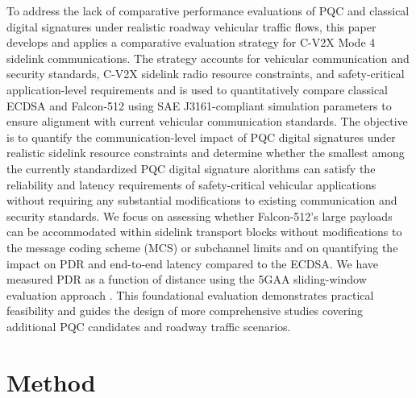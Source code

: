 \documentclass[conference]{IEEEtran}
\begin{document}
To address the lack of comparative performance evaluations of PQC and classical digital signatures under realistic roadway vehicular traffic flows, this paper develops and applies a comparative evaluation strategy for C-V2X Mode 4 sidelink communications. The strategy accounts for vehicular communication and security standards, C-V2X sidelink radio resource constraints, and safety-critical application-level requirements and is used to quantitatively compare classical ECDSA and Falcon-512 using SAE J3161-compliant simulation parameters to ensure alignment with current vehicular communication standards. The objective is to quantify the communication-level impact of PQC digital signatures under realistic sidelink resource constraints and determine whether the smallest among the currently standardized PQC digital signature alorithms can satisfy the reliability and latency requirements of safety-critical vehicular applications without requiring any substantial modifications to existing communication and security standards. We focus on assessing whether Falcon-512's large payloads can be accommodated within sidelink transport blocks without modifications to the message coding scheme (MCS) or subchannel limits and on quantifying the impact on PDR and end-to-end latency compared to the ECDSA. We have measured PDR as a function of distance using the 5GAA sliding-window evaluation approach \cite{5gaa_p190033}. This foundational evaluation demonstrates practical feasibility and guides the design of more comprehensive studies covering additional PQC candidates and roadway traffic scenarios.

\section{Method}
\label{sec: method}
\end{document}
